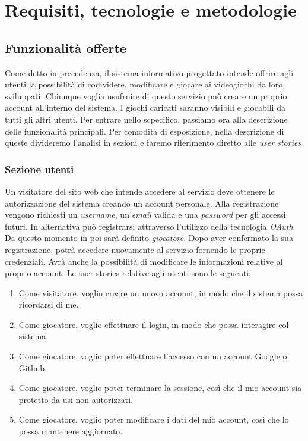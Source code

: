 \chapter{Requisiti, tecnologie e metodologie}

\section{Funzionalità offerte}

Come detto in precedenza, il sistema informativo progettato intende offrire agli utenti la possibilità di codividere, modificare e giocare ai videogiochi da loro sviluppati.
\newline
Chiunque voglia usufruire di questo servizio può creare un proprio account all'interno del sistema. I giochi caricati saranno visibili e giocabili da tutti gli altri utenti.
\newline
Per entrare nello scpecifico, passiamo ora alla descrizione delle funzionalità principali. Per comodità di esposizione, nella descrizione di queste divideremo l'analisi in sezioni e faremo riferimento diretto alle \textit{user stories}

\subsection{Sezione utenti}

Un visitatore del sito web che intende accedere al servizio deve ottenere le autorizzazione del sistema creando un account personale. Alla registrazione vengono richiesti un \textit{username}, un'\textit{email} valida e una \textit{password} per gli accessi futuri. In alternativa può registrarsi attraverso l'utilizzo della tecnologia \textit{OAuth}. Da questo momento in poi sarà definito \textit{giocatore}. Dopo aver confermato la sua registrazione, potrà accedere nuovamente al servizio fornendo le proprie credenziali. Avrà anche la possibilità di modificare le informazioni relative al proprio account.
\newline
Le user stories relative agli utenti sono le seguenti:
\newline
\begin{enumerate}
\item Come visitatore, voglio creare un nuovo account, in modo che il sistema possa ricordarsi di me.
\item Come giocatore, voglio effettuare il login, in modo che possa interagire col sistema.
\item Come giocatore, voglio poter effettuare l'accesso con un account Google o Github.
\item Come giocatore, voglio poter terminare la sessione, così che il mio account sia protetto da usi non autorizzati.
\item Come giocatore, voglio poter modificare i dati del mio account, così che lo possa mantenere aggiornato.
\end{enumerate}

